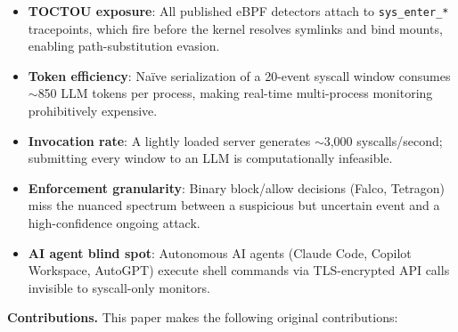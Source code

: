\documentclass[journal]{IEEEtran}
\begin{document}
\begin{itemize}
  \item \textbf{TOCTOU exposure}: All published eBPF detectors attach to
        \texttt{sys\_enter\_*} tracepoints, which fire before the kernel
        resolves symlinks and bind mounts, enabling path-substitution evasion.
  \item \textbf{Token efficiency}: Naïve serialization of a 20-event syscall
        window consumes $\sim$850 LLM tokens per process, making real-time
        multi-process monitoring prohibitively expensive.
  \item \textbf{Invocation rate}: A lightly loaded server generates
        $\sim$3{,}000 syscalls/second; submitting every window to an LLM is
        computationally infeasible.
  \item \textbf{Enforcement granularity}: Binary block/allow decisions
        (Falco, Tetragon) miss the nuanced spectrum between a suspicious but
        uncertain event and a high-confidence ongoing attack.
  \item \textbf{AI agent blind spot}: Autonomous AI agents (Claude Code,
        Copilot Workspace, AutoGPT) execute shell commands via TLS-encrypted
        API calls invisible to syscall-only monitors.
\end{itemize}

\vspace{2pt}
\noindent\textbf{Contributions.} This paper makes the following original
contributions:
\end{document}
